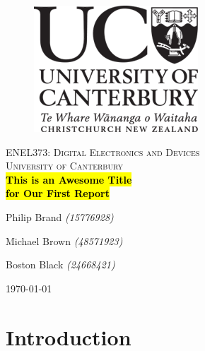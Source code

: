 \documentclass[11pt]{article}
\begin{document}
\begin{titlepage}
    \begin{center}
      \begin{figure}
        \includegraphics[right]{logo.png}
      \end{figure}
      \vspace*{1cm}
      \textsc{\large ENEL373: Digital Electronics and Devices}\\[0.5cm]
      \textsc{\Large University of Canterbury}\\[3.5cm]
      \linespread{1}
      {\Huge\bfseries \hl{This is an Awesome Title \\[0.3cm] for Our First Report}} \\
      \vspace*{2cm}
      {\Huge Philip Brand \textit{\Large(15776928)}\\\par}
      {\Huge Michael Brown \textit{\Large(48571923)}\\\par}
      {\Huge Boston Black \textit{\Large(24668421)}\\\par}
      \vspace*{3cm}
      {\LARGE \today}
    \end{center}
  \end{titlepage}
\restoregeometry

\fancyhead{}
\fancyhead[R]{\small{\today}}


\renewcommand{\baselinestretch}{1.3}\normalsize
\setlength{\cftbeforesecskip}{0.3em}
\renewcommand{\cftsecleader}{\cftdotfill{\cftdotsep}}
\tableofcontents\thispagestyle{fancy}
\renewcommand{\baselinestretch}{1}\normalsize

\newpage
{}

\section{Introduction}
\end{document}
